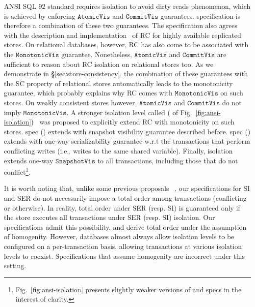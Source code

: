ANSI SQL 92 standard requires  isolation to avoid
dirty reads phenomenon, which is achieved by enforcing
$\mathtt{AtomicVis}$ and $\mathtt{CommitVis}$ guarantees. 
specification is therefore a combination of these two guarantees. The
specification also agrees with the description and
implementation~\cite{bailishat,pldi15} of RC for highly available
replicated stores. On relational databases, however, RC has also come
to be associated with the $\mathtt{MonotonicVis}$ guarantee.
Nonetheless, $\mathtt{AtomicVis}$ and $\mathtt{CommitVis}$ are
sufficient to reason about RC isolation on relational stores too. As
we demonstrate in \S\ref{sec:store-consistency}, the combination of
these guarantees with the SC property of relational stores
automatically leads to the monotonicity guarantee, which probably
explains why RC comes with $\mathtt{MonotonicVis}$ on such stores. On
weakly consistent stores however, $\mathtt{AtomicVis}$ and
$\mathtt{CommitVis}$ do not imply $\mathtt{MonotonicVis}$. A stronger
isolation level called  ( of
Fig.~\ref{fig:ansi-isolation})~\cite{bailishat,pldi15} was proposed to
explicitly extend RC with monotonicity on such stores.  spec () extends  with snapshot visibility guarantee
described before.  spec () extends
 with one-way serializability guarantee w.r.t the transactions
that perform conflicting writes (i.e., writes to the same shared
variable). Finally,  isolation extends one-way
$\mathtt{SnapshotVis}$ to all transactions, including those that do
not conflict\footnote{Fig.~\ref{fig:ansi-isolation} presents slightly
weaker versions of  and  specs in the interest of
clarity.}. 

It is worth noting that, unlike some previous proposals
~\cite{gotsmanconcur15}, our specifications for SI and SER do not
necessarily impose a total order among transactions (conflicting or
otherwise). In reality, total order under SER (resp. SI) is guaranteed
only if the store executes all transactions under SER (resp. SI)
isolation. Our specifications admit this possibility, and derive total
order under the assumption of homogenity. However, databases almost
always allow isolation levels to be configured on a per-transaction
basis, allowing transactions at various isolation levels to coexist.
Specifications that assume homogenity are incorrect under this
setting.

